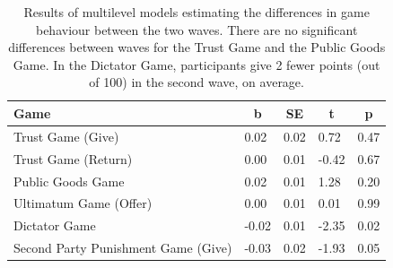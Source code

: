 \documentclass[
  man,floatsintext]{apa6}
\begin{document}
\begin{table}[H]

\begin{center}
\begin{threeparttable}

\caption{\label{tab:diffTable}Results of multilevel models estimating the differences
in game behaviour between the two waves. There are no significant differences
between waves for the Trust Game and the Public Goods Game. In the Dictator
Game, participants give 2 fewer points (out of 100) in the second wave, on
average.}

\begin{tabular}{lllll}
\toprule
Game & \multicolumn{1}{c}{b} & \multicolumn{1}{c}{SE} & \multicolumn{1}{c}{t} & \multicolumn{1}{c}{p}\\
\midrule
Trust Game (Give) & 0.02 & 0.02 & 0.72 & 0.47\\
Trust Game (Return) & 0.00 & 0.01 & -0.42 & 0.67\\
Public Goods Game & 0.02 & 0.01 & 1.28 & 0.20\\
Ultimatum Game (Offer) & 0.00 & 0.01 & 0.01 & 0.99\\
Dictator Game & -0.02 & 0.01 & -2.35 & 0.02\\
Second Party Punishment Game (Give) & -0.03 & 0.02 & -1.93 & 0.05\\
\bottomrule
\end{tabular}

\end{threeparttable}
\end{center}

\end{table}

\newpage
\end{document}
